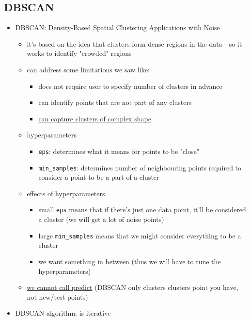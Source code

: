\documentclass[10.5pt,a4paper, fleqn, dvipsnames]{article}
\begin{document}
\subsection*{DBSCAN}
\begin{itemize}
    \item DBSCAN: Density-Based Spatial Clustering Applications with Noise
    \begin{itemize}
        \item it's based on the idea that clusters form dense regions in the data - so it works to identify "crowded" regions 
        \item can address some limitations we saw like:
        \begin{itemize}[leftmargin = 2em]
            \item does not require user to specify number of clusters in advance
            \item can identify points that are not part of any clusters
            \item \ul{can capture clusters of complex shape}
        \end{itemize}
        \item hyperparameters
        \begin{itemize}[leftmargin = 2em]
            \item \lstinline{eps}: determines what it means for points to be "close"
            \item \lstinline{min_samples}: determines number of neighbouring points required to consider a point to be a part of a cluster
        \end{itemize}
        \item effects of hyperparameters
        \begin{itemize}[leftmargin = 2em]
            \item small \lstinline{eps} means that if there's just one data point, it'll be considered a cluster (we will get a lot of noise points)
            \item large \lstinline{min_samples} means that we might consider everything to be a cluster 
            \item we want something in between (thus we will have to tune the hyperparameters)
        \end{itemize}
        \item \ul{we cannot call predict} (DBSCAN only clusters clusters point you have, not new/test points)
    \end{itemize}
    \item DBSCAN algorithm: is iterative

\end{itemize}
\end{document}
